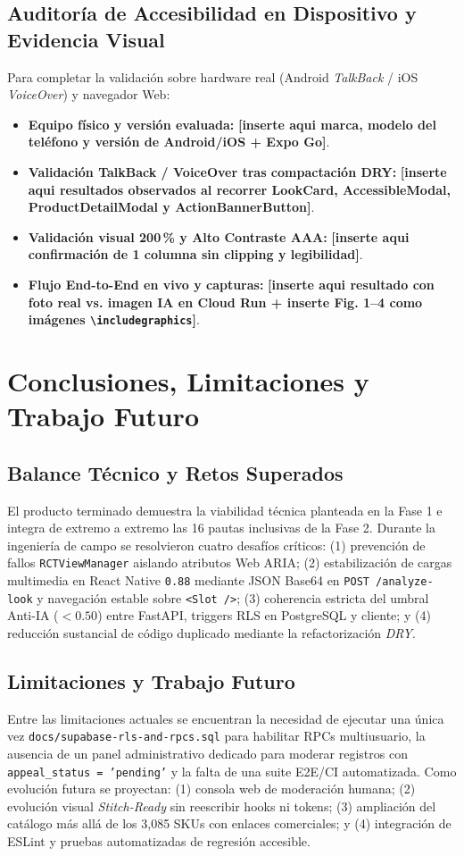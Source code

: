 \documentclass[conference]{IEEEtran}
\begin{document}
\subsection{Auditoría de Accesibilidad en Dispositivo y Evidencia Visual}
Para completar la validación sobre hardware real (Android \textit{TalkBack} / iOS \textit{VoiceOver}) y navegador Web:
\begin{itemize}
    \item \textbf{Equipo físico y versión evaluada:} \textbf{[inserte aqui marca, modelo del teléfono y versión de Android/iOS + Expo Go]}.
    \item \textbf{Validación TalkBack / VoiceOver tras compactación DRY:} \textbf{[inserte aqui resultados observados al recorrer LookCard, AccessibleModal, ProductDetailModal y ActionBannerButton]}.
    \item \textbf{Validación visual 200\,\% y Alto Contraste AAA:} \textbf{[inserte aqui confirmación de 1 columna sin clipping y legibilidad]}.
    \item \textbf{Flujo End-to-End en vivo y capturas:} \textbf{[inserte aqui resultado con foto real vs. imagen IA en Cloud Run + inserte Fig. 1--4 como imágenes \texttt{\textbackslash includegraphics}]}.
\end{itemize}

\section{Conclusiones, Limitaciones y Trabajo Futuro}

\subsection{Balance Técnico y Retos Superados}
El producto terminado demuestra la viabilidad técnica planteada en la Fase 1 e integra de extremo a extremo las 16 pautas inclusivas de la Fase 2. Durante la ingeniería de campo se resolvieron cuatro desafíos críticos: (1) prevención de fallos \texttt{RCTViewManager} aislando atributos Web ARIA; (2) estabilización de cargas multimedia en React Native \texttt{0.88} mediante JSON Base64 en \texttt{POST /analyze-look} y navegación estable sobre \texttt{<Slot />}; (3) coherencia estricta del umbral Anti-IA ($< 0.50$) entre FastAPI, triggers RLS en PostgreSQL y cliente; y (4) reducción sustancial de código duplicado mediante la refactorización \textit{DRY}.

\subsection{Limitaciones y Trabajo Futuro}
Entre las limitaciones actuales se encuentran la necesidad de ejecutar una única vez \texttt{docs/supabase-rls-and-rpcs.sql} para habilitar RPCs multiusuario, la ausencia de un panel administrativo dedicado para moderar registros con \texttt{appeal\_status = 'pending'} y la falta de una suite E2E/CI automatizada. Como evolución futura se proyectan: (1) consola web de moderación humana; (2) evolución visual \textit{Stitch-Ready} sin reescribir hooks ni tokens; (3) ampliación del catálogo más allá de los 3,085 SKUs con enlaces comerciales; y (4) integración de ESLint y pruebas automatizadas de regresión accesible.
\end{document}
